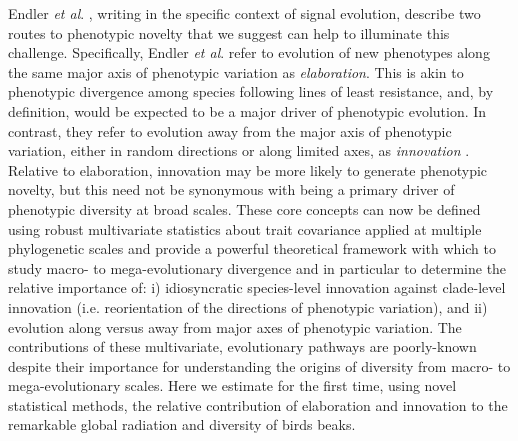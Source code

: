 \documentclass[12pt,letterpaper]{article}
\begin{document}
Endler \textit{et al}. \cite{endler2005animal}, writing in the specific context of signal evolution, describe two routes to phenotypic novelty that we suggest can help to illuminate this challenge.
Specifically, Endler \textit{et al}. refer to evolution of new phenotypes along the same major axis of phenotypic variation as \textit{elaboration}.
This is akin to phenotypic divergence among species following lines of least resistance, and, by definition, would be expected to be a major driver of phenotypic evolution.
In contrast, they refer to evolution away from the major axis of phenotypic variation, either in random directions or along limited axes, as \textit{innovation} \cite{endler2005animal}.
Relative to elaboration, innovation may be more likely to generate phenotypic novelty, but this need not be synonymous with being a primary driver of phenotypic diversity at broad scales.
These core concepts can now be defined using robust multivariate statistics about trait covariance applied at multiple phylogenetic scales and provide a powerful theoretical framework with which to study macro- to mega-evolutionary divergence and in particular to determine the relative importance of:
i) idiosyncratic species-level innovation against clade-level innovation (i.e. reorientation of the directions of phenotypic variation),
and ii) evolution along versus away from major axes of phenotypic variation.
The contributions of these multivariate, evolutionary pathways are poorly-known despite their importance for understanding the origins of diversity from macro- to mega-evolutionary scales. 
Here we estimate for the first time, using novel statistical methods, the relative contribution of elaboration and innovation to the remarkable global radiation and diversity of birds beaks.
 
\end{document}

